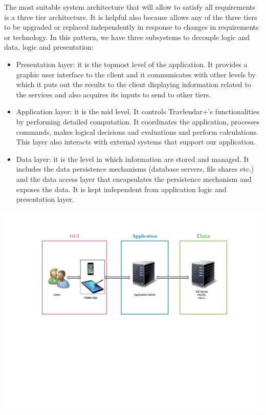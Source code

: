 \documentclass[12pt,titlepage]{article}
\begin{document}
The most suitable system architecture that will allow to satisfy all requirements is a three tier architecture. It is helpful also because allows any of the three tiers to be upgraded or replaced independently in response to changes in requirements or technology.
In this pattern, we have three subsystems to decouple logic and data, logic and presentation: 
\begin{itemize}
\item Presentation layer: it is the topmost level of the application. It provides a graphic user interface to the client and it communicates with other levels by which it puts out the results to the client displaying information  related to the services and also acquires its inputs to send to other tiers.
\item Application layer:  it is the mid level. It controls Travlendar+'s functionalities by performing detailed computation. It coordinates the application, processes commands, makes logical decisions and evaluations and perform calculations. This layer also interacts with external systems that support our application.
\item Data layer: it is the level in which information are stored and managed. It includes the data persistence mechanisms (database servers, file shares etc.) and the data access layer that encapsulates the persistence mechanism and exposes the data. It is kept independent from application logic and presentation layer.
\end{itemize}

\includegraphics[scale=0.5]{"Diagrams/General Architecture - Page 1"}
\pagebreak
\end{document}
